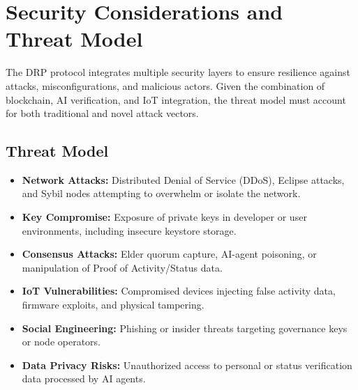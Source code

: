 \documentclass[11pt,a4paper]{article}
\begin{document}
\section{Security Considerations and Threat Model}

The DRP protocol integrates multiple security layers to ensure resilience against attacks, misconfigurations, and malicious actors. Given the combination of blockchain, AI verification, and IoT integration, the threat model must account for both traditional and novel attack vectors.

\subsection{Threat Model}
\begin{itemize}
    \item \textbf{Network Attacks:} Distributed Denial of Service (DDoS), Eclipse attacks, and Sybil nodes attempting to overwhelm or isolate the network.
    \item \textbf{Key Compromise:} Exposure of private keys in developer or user environments, including insecure keystore storage.
    \item \textbf{Consensus Attacks:} Elder quorum capture, AI-agent poisoning, or manipulation of Proof of Activity/Status data.
    \item \textbf{IoT Vulnerabilities:} Compromised devices injecting false activity data, firmware exploits, and physical tampering.
    \item \textbf{Social Engineering:} Phishing or insider threats targeting governance keys or node operators.
    \item \textbf{Data Privacy Risks:} Unauthorized access to personal or status verification data processed by AI agents.
\end{itemize}
\end{document}
